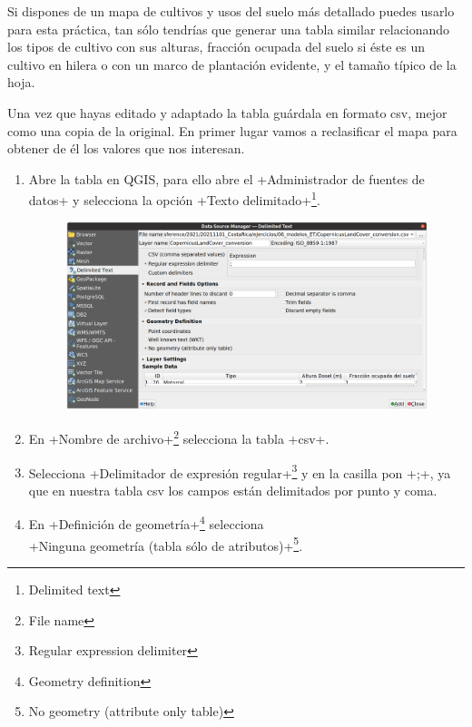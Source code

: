 \documentclass[a4paper,11pt]{article}
\begin{document}
      Si dispones de un mapa de cultivos y usos del suelo más detallado puedes usarlo para esta práctica, tan sólo tendrías que generar una tabla similar relacionando los tipos de cultivo con sus alturas, fracción ocupada del suelo si éste es un cultivo en hilera o con un marco de plantación evidente, y el tamaño típico de la hoja.
      
      Una vez que hayas editado y adaptado la tabla guárdala en formato csv, mejor como una copia de la original. En primer lugar vamos a reclasificar el mapa para obtener de él los valores que nos interesan.
            
      \begin{enumerate}
       \item Abre la tabla en QGIS, para ello abre el \cverb+Administrador de fuentes de datos+ y selecciona la opción \cverb+Texto delimitado+\footnote{Delimited text}.
       \begin{figure}[H]\centering
        \includegraphics[width=\textwidth]{qgis_delimited_text}
       \end{figure}
       
       \item En \cverb+Nombre de archivo+\footnote{File name} selecciona la tabla \cverb+csv+.
       
       \item Selecciona \cverb+Delimitador de expresión regular+\footnote{Regular expression delimiter} y en la casilla pon \cverb+;+, ya que en nuestra tabla csv los campos están delimitados por punto y coma.
       
       \item En \cverb+Definición de geometría+\footnote{Geometry definition} selecciona\\
       \cverb+Ninguna geometría (tabla sólo de atributos)+\footnote{No geometry (attribute only table)}.
       

\end{enumerate}
\end{document}
